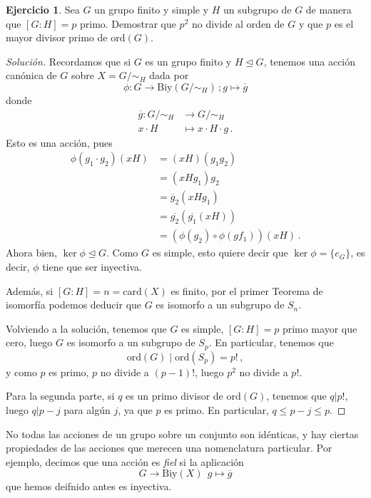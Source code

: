 \documentclass[a4paper,11pt]{amsart}
\theoremstyle{plain}
\theoremstyle{definition}
\newtheorem{ejercicio}[thm]{Ejercicio}
\theoremstyle{remark}
\newenvironment{solution}
  {\begin{proof}[Solución]}
  {\end{proof}}
\begin{document}
\begin{ejercicio}
Sea $G$ un grupo finito y simple y $H$ un subgrupo de $G$ de manera que $[G : H] = p$ primo. Demostrar que $p^2$ no divide al orden de $G$ y que $p$ es el mayor divisor primo de $\text{ord}(G)$.
\end{ejercicio}

\begin{solution}
Recordamos que si $G$ es un grupo finito y $H \unlhd G$, tenemos una acción canónica de $G$ sobre $X = G/\sim_H$ dada por 
\[ \phi \colon G \to \text{Biy}\left( G/\sim_H \right) \, ; g \mapsto \overline{g} \]
donde 
\begin{align*}
    \overline{g} \colon G/ \sim_H & \to G/\sim_H \\
    x \cdot H & \mapsto x \cdot H \cdot g \, .
\end{align*}
Esto es una acción, pues 
\begin{align*}
    \phi(g_1 \cdot g_2)(xH) & = (xH)(g_1g_2)\\
    & = (xHg_1)g_2 \\
    & = \overline{g}_2(xHg_1) \\
    & = \overline{g_2}(\overline{g_1}(xH)) \\
    & = (\phi(g_2) \circ \phi(gf_1))(xH) \, .
\end{align*}
Ahora bien, $\ker \phi \trianglelefteq G$. Como $G$ es simple, esto quiere decir que $\ker \phi = \{ e_G\}$, es decir, $\phi$ tiene que ser inyectiva. 

Además, si $[G : H] = n = \text{card}(X)$ es finito, por el primer Teorema de isomorfía podemos deducir que $G$ es isomorfo a un subgrupo de $S_n$. 

Volviendo a la solución, tenemos que $G$ es simple, $[G:H] = p$ primo mayor que cero, luego $G$ es isomorfo a un subgrupo de $S_p$. En particular, tenemos que 
\[ \text{ord}(G) \mid \text{ord}(S_p) = p ! \, ,\]
y como $p$ es primo, $p$ no divide a $(p-1)!$, luego $p^2$ no divide a $p!$. 

Para la segunda parte, si $q$ es un primo divisor de $\text{ord}(G)$, tenemos que $q | p!$, luego $q | p - j$ para algún $j$, ya que $p$ es primo. En particular, $q \leq p - j \leq p$. 
\end{solution}


No todas las acciones de un grupo sobre un conjunto son idénticas, y hay ciertas propiedades de las acciones que merecen una nomenclatura particular. Por ejemplo, decimos que una acción es \textit{fiel} si la aplicación 
\[ G \to \text{Biy}(X) \, \; g \mapsto \overline{g} \] 
que hemos deifnido antes es inyectiva. 
\end{document}
